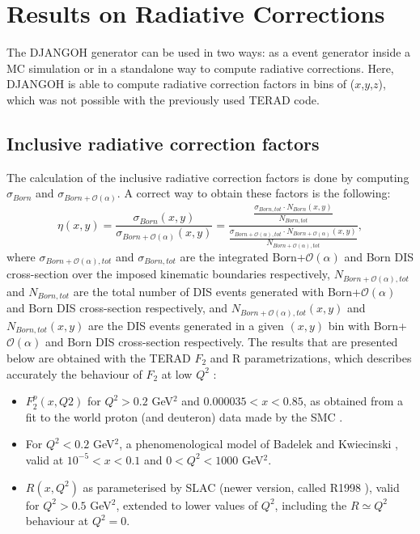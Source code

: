 
\chapter{Results on Radiative Corrections} %

\label{ch:RC} %


The DJANGOH generator can be used in two ways: as a event generator inside a MC simulation or in a standalone way to compute radiative corrections. Here, DJANGOH is able to compute radiative correction factors in bins of ($x$,$y$,$z$), which was not possible with the previously used TERAD code.

\section{Inclusive radiative correction factors}\label{sec:RCF}

The calculation of the inclusive radiative correction factors is done by computing $\sigma_{Born}$ and $\sigma_{Born+\mathscr{O}(\alpha)}$. A correct way to obtain these factors is the following:
%
\begin{equation}
  \eta(x,y)=\frac{\sigma_{Born}(x,y)}{\sigma_{Born+\mathscr{O}(\alpha)}(x,y)}
  =\frac{\frac{\sigma_{Born,tot} \cdot N_{Born}(x,y)}{N_{Born,tot}}}{\frac{\sigma_{Born+\mathscr{O}(\alpha),tot} \cdot N_{Born+\mathscr{O}(\alpha)}(x,y)}{N_{Born+\mathscr{O}(\alpha),tot}}},
\end{equation}
%
where $\sigma_{Born+\mathscr{O}(\alpha),tot}$ and $\sigma_{Born,tot}$ are the integrated Born+$\mathscr{O}(\alpha)$ and Born DIS cross-section over the imposed kinematic boundaries respectively, $N_{Born+\mathscr{O}(\alpha),tot}$ and $N_{Born,tot}$ are the total number of DIS events generated with Born+$\mathscr{O}(\alpha)$ and Born DIS cross-section respectively, and $N_{Born+\mathscr{O}(\alpha),tot}(x,y)$ and $N_{Born,tot}(x,y)$ are the DIS events generated in a given $(x,y)$ bin with Born+$\mathscr{O}(\alpha)$ and Born DIS cross-section respectively. The results that are presented below are obtained with the TERAD $F_{2}$ and R parametrizations, which describes accurately the behaviour of $F_{2}$ at low $Q^{2}$ \cite{BPnote}:

\begin{itemize}
\item $F^{p}_{2}(x,Q2)$ for $Q^2 > 0.2$ GeV$^2$ and $0.000035 < x < 0.85$, as obtained from a fit to the
world proton (and deuteron) data made by the SMC \cite{SMC}.
\item For $Q^2 < 0.2$ GeV$^2$, a phenomenological model of Badelek and Kwiecinski \cite{BK}, valid at $10^{-5} < x < 0.1$
and $0 < Q^2 < 1000$ GeV$^2$.
\item $R(x, Q^2)$ as parameterised by SLAC (newer version, called R1998 \cite{R1998}), valid for $Q^2 > 0.5$ GeV$^2$, extended
to lower values of $Q^2$, including the $R \simeq Q^2$ behaviour at $Q^2 = 0$.
\end{itemize}

